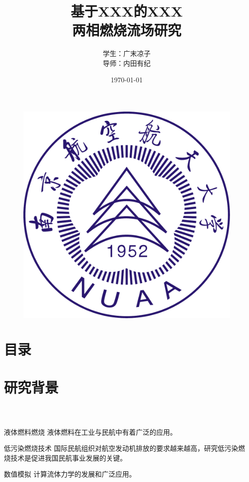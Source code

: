 \documentclass[compress]{beamer}%
\begin{document}
\graphicspath{{figures/}} %
\captionsetup[figure]{font=footnotesize,labelfont=footnotesize}

\title{基于XXX的XXX\\两相燃烧流场研究}
\author[广末凉子]{学生：广末凉子\\ \vskip 5pt 导师：内田有纪}
\date{\small \vskip -22pt \today}
\begin{frame}
	\vspace{-10mm}
		\maketitle
	\vspace{-44mm}
	\begin{figure}[htbp]
		\begin{center}
			\includegraphics[width=0.14\linewidth]{logo.pdf}
		\end{center}
	\end{figure}
\end{frame}
\section*{目录}
\begin{frame}
	\frametitle{\secname}
	\tableofcontents[sections={<1-5>}]
\end{frame}
  



\section{研究背景}
\begin{frame}
	\frametitle{\secname~ }
	\begin{block}{液体燃料燃烧}
		液体燃料在工业与民航中有着广泛的应用。
	\end{block}
	\begin{block}{低污染燃烧技术}
		国际民航组织对航空发动机排放的要求越来越高，研究低污染燃烧技术是促进我国民航事业发展的关键。
	\end{block}
	\begin{block}{数值模拟}
		计算流体力学的发展和广泛应用。
	\end{block}
\end{frame}
\end{document}
